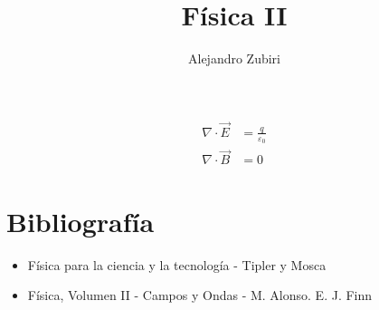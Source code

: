 \documentclass{report}
\author{Alejandro Zubiri}
\title{Física II}
\begin{document}
\maketitle
\begin{equation}
	\begin{split}
		\nabla \cdot \vec{E} &= \frac{q}{\varepsilon_{0}}\\
		\nabla \cdot \vec{B} &= 0
	\end{split}
\end{equation}
\pagebreak
\tableofcontents
\pagebreak
\section{Bibliografía}
\begin{itemize}
	\item Física para la ciencia y la tecnología - Tipler y Mosca
	\item Física, Volumen II - Campos y Ondas - M. Alonso. E. J. Finn
\end{itemize}


\end{document}
